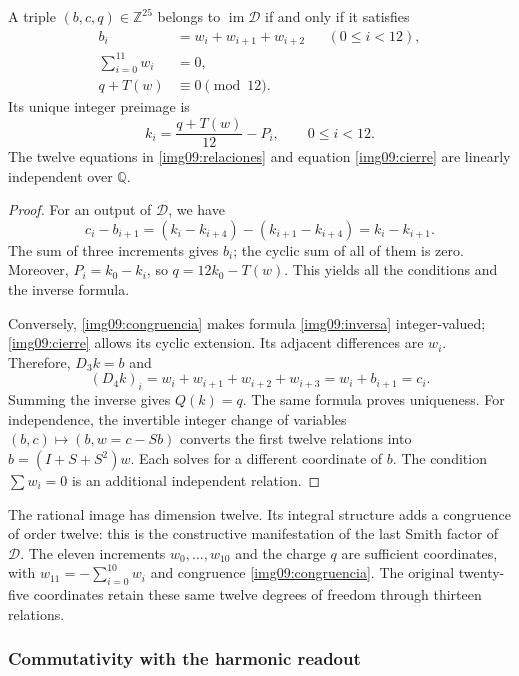 \begin{theorem}
\label{img09:imagen}
A triple $(b,c,q)\in\mathbb Z^{25}$ belongs to
$\operatorname{im}\mathcal D$ if and only if it satisfies
\begin{align}
 b_i&=w_i+w_{i+1}+w_{i+2}&& (0\leq i<12),
 \label{img09:relaciones}\\
 \sum_{i=0}^{11}w_i&=0,
 \label{img09:cierre}\\
 q+T(w)&\equiv0\pmod {12}.
 \label{img09:congruencia}
\end{align}
Its unique integer preimage is
\begin{equation}
 k_i=\frac{q+T(w)}{12}-P_i,\qquad0\leq i<12.
 \label{img09:inversa}
\end{equation}
The twelve equations in \eqref{img09:relaciones} and equation
\eqref{img09:cierre} are linearly independent over $\mathbb Q$.
\end{theorem}
\begin{proof}
For an output of $\mathcal D$, we have
\[
 c_i-b_{i+1}=(k_i-k_{i+4})-(k_{i+1}-k_{i+4})=k_i-k_{i+1}.
\]
The sum of three increments gives $b_i$; the cyclic sum of all of them
is zero. Moreover, $P_i=k_0-k_i$, so
$q=12k_0-T(w)$. This yields all the conditions and the inverse formula.

Conversely, \eqref{img09:congruencia} makes formula
\eqref{img09:inversa} integer-valued; \eqref{img09:cierre} allows its
cyclic extension. Its adjacent differences are $w_i$. Therefore,
$D_3k=b$ and
\[
 (D_4k)_i=w_i+w_{i+1}+w_{i+2}+w_{i+3}
 =w_i+b_{i+1}=c_i.
\]
Summing the inverse gives $Q(k)=q$. The same formula proves uniqueness.
For independence, the invertible integer change of variables
$(b,c)\mapsto(b,w=c-Sb)$ converts the first twelve relations into
$b=(I+S+S^2)w$. Each solves for a different coordinate of $b$.
The condition $\sum w_i=0$ is an additional independent relation.
\end{proof}

The rational image has dimension twelve. Its integral structure adds
a congruence of order twelve: this is the constructive manifestation of the
last Smith factor of $\mathcal D$. The eleven increments
$w_0,\ldots,w_{10}$ and the charge $q$ are sufficient coordinates, with
$w_{11}=-\sum_{i=0}^{10}w_i$ and congruence
\eqref{img09:congruencia}. The original twenty-five coordinates
retain these same twelve degrees of freedom through thirteen relations.

\subsubsection{Commutativity with the harmonic readout}

